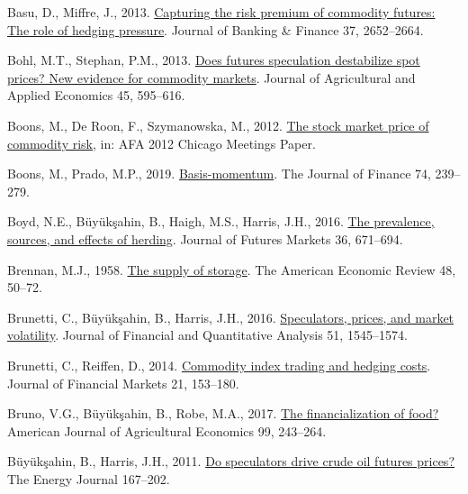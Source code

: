 \documentclass[]{elsarticle} %
\newlength{\cslhangindent}
\newlength{\cslentryspacingunit} %
\newenvironment{CSLReferences}[2] %
 {%
  \setlength{\parindent}{0pt}
  \ifodd #1
  \let\oldpar\par
  \def\par{\hangindent=\cslhangindent\oldpar}
  \fi
  \setlength{\parskip}{#2\cslentryspacingunit}
 }%
 {}
\begin{document}
\begin{CSLReferences}{1}{0}
\leavevmode{}%
Basu, D., Miffre, J., 2013. \href{https://doi.org/10.1016/j.jbankfin.2013.02.031}{Capturing the risk premium of commodity futures: The role of hedging pressure}. Journal of Banking \& Finance 37, 2652--2664.

\leavevmode{}%
Bohl, M.T., Stephan, P.M., 2013. \href{https://doi.org/10.1017/s1074070800005150}{Does futures speculation destabilize spot prices? New evidence for commodity markets}. Journal of Agricultural and Applied Economics 45, 595--616.

\leavevmode{}%
Boons, M., De Roon, F., Szymanowska, M., 2012. \href{https://doi.org/10.2139/ssrn.1785728}{The stock market price of commodity risk}, in: AFA 2012 Chicago Meetings Paper.

\leavevmode{}%
Boons, M., Prado, M.P., 2019. \href{https://doi.org/10.1111/jofi.12738}{Basis-momentum}. The Journal of Finance 74, 239--279.

\leavevmode{}%
Boyd, N.E., Büyükşahin, B., Haigh, M.S., Harris, J.H., 2016. \href{https://doi.org/10.1002/fut.21756}{The prevalence, sources, and effects of herding}. Journal of Futures Markets 36, 671--694.

\leavevmode{}%
Brennan, M.J., 1958. \href{https://www.jstor.org/stable/1812340}{The supply of storage}. The American Economic Review 48, 50--72.

\leavevmode{}%
Brunetti, C., Büyükşahin, B., Harris, J.H., 2016. \href{https://doi.org/10.1017/s0022109016000569}{Speculators, prices, and market volatility}. Journal of Financial and Quantitative Analysis 51, 1545--1574.

\leavevmode{}%
Brunetti, C., Reiffen, D., 2014. \href{https://doi.org/10.1016/j.finmar.2014.08.001}{Commodity index trading and hedging costs}. Journal of Financial Markets 21, 153--180.

\leavevmode{}%
Bruno, V.G., Büyükşahin, B., Robe, M.A., 2017. \href{https://doi.org/10.1093/ajae/aaw059}{The financialization of food?} American Journal of Agricultural Economics 99, 243--264.

\leavevmode{}%
Büyükşahin, B., Harris, J.H., 2011. \href{https://www.jstor.org/stable/41323326}{Do speculators drive crude oil futures prices?} The Energy Journal 167--202.


\end{CSLReferences}
\end{document}
